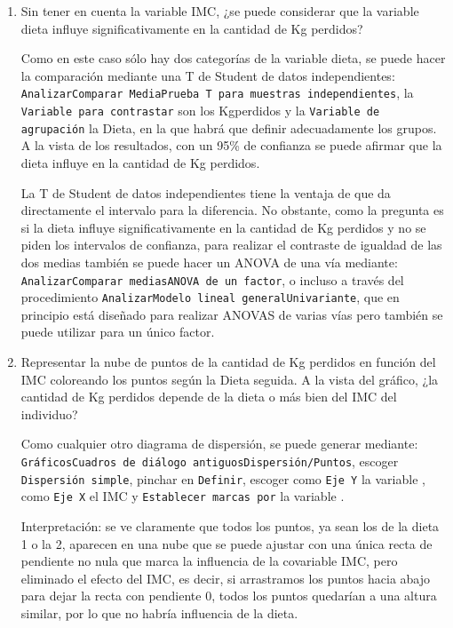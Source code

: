 \begin{enumerate}
\begin{enumerate}
\item Sin tener en cuenta la variable IMC, ¿se puede considerar que la variable dieta influye significativamente en la cantidad de Kg perdidos?

\begin{indicacion}{Como en este caso sólo hay dos categorías de la variable dieta, se puede hacer la comparación mediante una T de Student de datos independientes: \texttt{Analizar\flecha Comparar Media\flecha Prueba T para muestras independientes}, la \texttt{Variable para contrastar} son los \textsf{Kgperdidos} y la \texttt{Variable de agrupación} la \textsf{Dieta}, en la que habrá que definir adecuadamente los grupos. A la vista de los resultados, con un 95\% de confianza se puede afirmar que la dieta influye en la cantidad de Kg perdidos.

La T de Student de datos independientes tiene la ventaja de que da directamente el intervalo para la diferencia. No obstante, como la pregunta es si la dieta influye significativamente en la cantidad de Kg perdidos y no se piden los intervalos de confianza, para realizar el contraste de igualdad de las dos medias también se puede hacer un ANOVA de una vía mediante: \texttt{Analizar\flecha Comparar medias\flecha ANOVA de un factor}, o incluso a través del procedimiento \texttt{Analizar\flecha Modelo lineal general\flecha Univariante}, que en principio está diseñado para realizar ANOVAS de varias vías pero también se puede utilizar para un único factor.


}
\end{indicacion}

\item Representar la nube de puntos de la cantidad de Kg perdidos en función del IMC coloreando los puntos según la Dieta seguida. A la vista del gráfico, ¿la cantidad de Kg perdidos depende de la dieta o más bien del IMC del individuo?

\begin{indicacion}{Como cualquier otro diagrama de dispersión, se puede generar mediante: \texttt{Gráficos\flecha Cuadros de diálogo antiguos\flecha Dispersión/Puntos}, escoger \texttt{Dispersión simple}, pinchar en \texttt{Definir}, escoger como \texttt{Eje Y} la variable , como \texttt{Eje X} el \textsf{IMC} y \texttt{Establecer marcas por} la variable .

Interpretación: se ve claramente que todos los puntos, ya sean los de la dieta 1 o la 2, aparecen en una nube que se puede ajustar con una única recta de pendiente no nula que marca la influencia de la covariable IMC, pero eliminado el efecto del IMC, es decir, si arrastramos los puntos hacia abajo para dejar la recta con pendiente 0, todos los puntos quedarían a una altura similar, por lo que no habría influencia de la dieta.


}
\end{indicacion}
\end{enumerate}
\end{enumerate}
